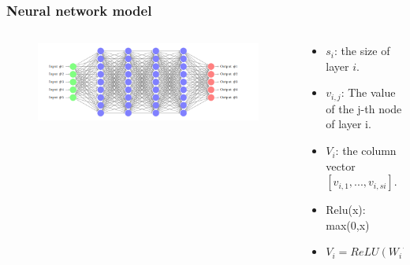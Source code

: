 \documentclass[aspectratio=169%
,serif,mathserif]{beamer}
\begin{document}
\begin{frame}
	\frametitle{Neural network model}
	\begin{columns}
		\begin{column}{.6\textwidth}
			\begin{figure}[htbp]
				\includegraphics[width=1\linewidth]{1.png}
			\end{figure}
		\end{column}

		\begin{column}{.4\textwidth}
			\begin{itemize}
				\item $s_i$: the size of layer $i$.
				\item $v_{i,j}$: The value of the j-th node of layer i.
				\item $V_i$: the column vector $[v_{i,1}, . . . , v_{i,si} ]$.
				\item Relu(x): max(0,x)
				\item $V_i = ReLU(W_iV_{i−1} + B_i), W_i: s_i \times s_{i-1},B_i: s_i$
			\end{itemize}
		\end{column}
	\end{columns}

\end{frame}
\end{document}
